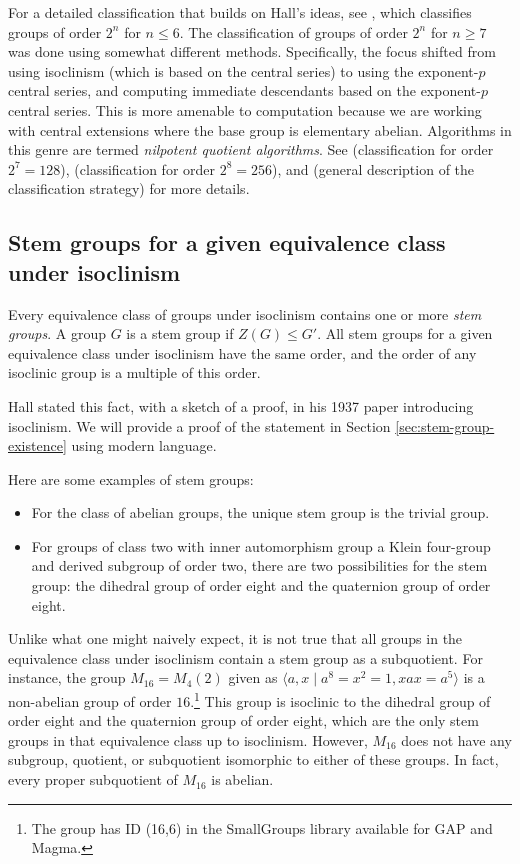 For a detailed classification that builds on Hall's ideas, see
\cite{HallSenior}, which classifies groups of order $2^n$ for $n \le
6$. The classification of groups of order $2^n$ for $n \ge 7$ was done
using somewhat different methods. Specifically, the focus shifted from
using isoclinism (which is based on the central series) to using the
exponent-$p$ central series, and computing immediate descendants based
on the exponent-$p$ central series. This is more amenable to
computation because we are working with central extensions where the
base group is elementary abelian. Algorithms in this genre are termed
{\em nilpotent quotient algorithms}. See \cite{Order128}
(classification for order $2^7 = 128$), \cite{Order256}
(classification for order $2^8 = 256$), and \cite{enumeratingpgroups}
(general description of the classification strategy) for more details.

\subsection{Stem groups for a given equivalence class under isoclinism}\label{sec:stem-group}

Every equivalence class of groups under isoclinism contains one or
more {\em stem groups}. A group $G$ is a stem group if $Z(G) \le
G'$. All stem groups for a given equivalence class under
isoclinism have the same order, and the order of any isoclinic group is
a multiple of this order.

Hall stated this fact, with a sketch of a proof, in his 1937 paper
introducing isoclinism. We will provide a proof of the statement in
Section \ref{sec:stem-group-existence} using modern language.

Here are some examples of stem groups:

\begin{itemize}
\item For the class of abelian groups, the unique stem group
  is the trivial group. 

\item For groups of class two with inner automorphism group a Klein
  four-group and derived subgroup of order two, there are two
  possibilities for the stem group: the dihedral group of order eight
  and the quaternion group of order eight.

\end{itemize}

Unlike what one might naively expect, it is not true that all groups
in the equivalence class under isoclinism contain a stem group as a
subquotient. For instance, the group $M_{16} = M_4(2)$ given as
$\langle a,x \mid a^8 = x^2 = 1, xax = a^5 \rangle$ is a non-abelian
group of order $16$.\footnote{The group has ID (16,6) in the
  SmallGroups library available for GAP and Magma.} This group is
isoclinic to the dihedral group of order eight and the quaternion
group of order eight, which are the only stem groups in that
equivalence class up to isoclinism. However, $M_{16}$ does not have
any subgroup, quotient, or subquotient isomorphic to either of these
groups. In fact, every proper subquotient of $M_{16}$ is abelian.

